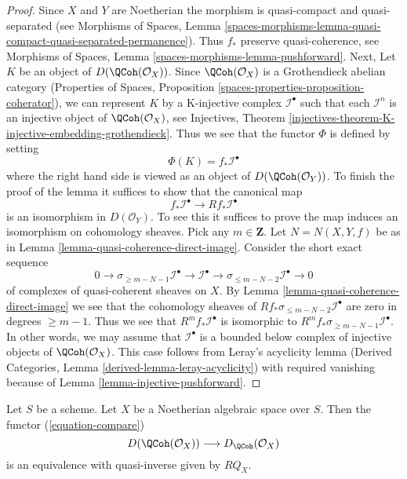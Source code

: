 \begin{proof}
Since $X$ and $Y$ are Noetherian the morphism is quasi-compact
and quasi-separated (see
Morphisms of Spaces, Lemma
\ref{spaces-morphisms-lemma-quasi-compact-quasi-separated-permanence}).
Thus $f_*$ preserve quasi-coherence, see
Morphisms of Spaces, Lemma \ref{spaces-morphisms-lemma-pushforward}.
Next, Let $K$ be an object of $D(\QCoh(\mathcal{O}_X))$.
Since $\QCoh(\mathcal{O}_X)$ is a Grothendieck abelian category
(Properties of Spaces, Proposition
\ref{spaces-properties-proposition-coherator}), we can
represent $K$ by a K-injective complex $\mathcal{I}^\bullet$
such that each $\mathcal{I}^n$ is an injective object of
$\QCoh(\mathcal{O}_X)$, see
Injectives, Theorem
\ref{injectives-theorem-K-injective-embedding-grothendieck}.
Thus we see that the functor $\Phi$ is defined by setting
$$
\Phi(K) = f_*\mathcal{I}^\bullet
$$
where the right hand side is viewed as an object of
$D(\QCoh(\mathcal{O}_Y))$. To finish the proof of the lemma
it suffices to show that the canonical map
$$
f_*\mathcal{I}^\bullet \longrightarrow Rf_*\mathcal{I}^\bullet
$$
is an isomorphism in $D(\mathcal{O}_Y)$. To see this it suffices to
prove the map induces an isomorphism on cohomology sheaves. Pick any
$m \in \mathbf{Z}$. Let $N = N(X, Y, f)$ be as in
Lemma \ref{lemma-quasi-coherence-direct-image}.
Consider the short exact sequence
$$
0 \to \sigma_{\geq m - N - 1}\mathcal{I}^\bullet \to
\mathcal{I}^\bullet \to \sigma_{\leq m - N - 2}\mathcal{I}^\bullet \to 0
$$
of complexes of quasi-coherent sheaves on $X$. By
Lemma \ref{lemma-quasi-coherence-direct-image}
we see that the cohomology sheaves of
$Rf_*\sigma_{\leq m - N - 2}\mathcal{I}^\bullet$
are zero in degrees $\geq m - 1$. Thus we see that
$R^mf_*\mathcal{I}^\bullet$ is isomorphic to
$R^mf_*\sigma_{\geq m - N - 1}\mathcal{I}^\bullet$.
In other words, we may assume that $\mathcal{I}^\bullet$
is a bounded below complex of injective objects of
$\QCoh(\mathcal{O}_X)$.
This case follows from Leray's acyclicity lemma
(Derived Categories, Lemma \ref{derived-lemma-leray-acyclicity})
with required vanishing because of Lemma \ref{lemma-injective-pushforward}.
\end{proof}

\begin{proposition}
\label{proposition-Noetherian}
Let $S$ be a scheme. Let $X$ be a Noetherian algebraic space over $S$.
Then the functor (\ref{equation-compare})
$$
D(\QCoh(\mathcal{O}_X))
\longrightarrow
D_\QCoh(\mathcal{O}_X)
$$
is an equivalence with quasi-inverse given by $RQ_X$.
\end{proposition}

